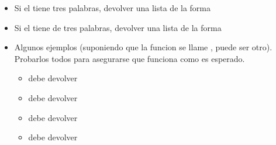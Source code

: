 \documentclass[a4paper,12pt,spanish]{sphinxmanual}
\begin{document}
\begin{itemize}
\begin{itemize}
\item {} 
\sphinxAtStartPar
Si el  tiene tres palabras, devolver una lista de la
forma 

\item {} 
\sphinxAtStartPar
Si el  tiene  de tres palabras, devolver una lista de la
forma 

\item {} 
\sphinxAtStartPar
Algunos ejemplos (suponiendo que la funcion se llame , puede ser otro).
Probarlos todos para asegurarse que funciona como es esperado.
\begin{itemize}
\item {} 
\sphinxAtStartPar
{} debe devolver 

\item {} 
\sphinxAtStartPar
{} debe devolver 

\item {} 
\sphinxAtStartPar
{} debe devolver 

\item {} 
\sphinxAtStartPar
{} debe devolver 

\end{itemize}

\end{itemize}

\end{itemize}
\end{document}

